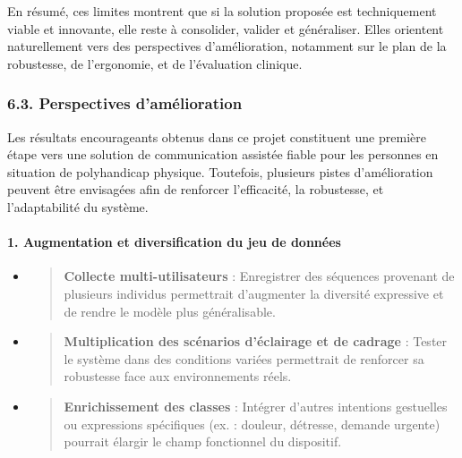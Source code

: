 \documentclass[
]{article}
\begin{document}
En résumé, ces limites montrent que si la solution proposée est techniquement viable et innovante, elle reste à consolider, valider et généraliser. Elles orientent naturellement vers des perspectives d'amélioration, notamment sur le plan de la robustesse, de l'ergonomie, et de l'évaluation clinique.

\hypertarget{perspectives-damuxe9lioration}{%
\subsubsection{6.3. Perspectives d'amélioration}\label{perspectives-damuxe9lioration}}

Les résultats encourageants obtenus dans ce projet constituent une première étape vers une solution de communication assistée fiable pour les personnes en situation de polyhandicap physique. Toutefois, plusieurs pistes d'amélioration peuvent être envisagées afin de renforcer l'efficacité, la robustesse, et l'adaptabilité du système.

\hypertarget{augmentation-et-diversification-du-jeu-de-donnuxe9es}{%
\paragraph{\texorpdfstring{\textbf{1. Augmentation et diversification du jeu de données}}{1. Augmentation et diversification du jeu de données}}\label{augmentation-et-diversification-du-jeu-de-donnuxe9es}}

\begin{itemize}
\item
  \begin{quote}
  \textbf{Collecte multi-utilisateurs} : Enregistrer des séquences provenant de plusieurs individus permettrait d'augmenter la diversité expressive et de rendre le modèle plus généralisable.
  \end{quote}
\item
  \begin{quote}
  \textbf{Multiplication des scénarios d'éclairage et de cadrage} : Tester le système dans des conditions variées permettrait de renforcer sa robustesse face aux environnements réels.
  \end{quote}
\item
  \begin{quote}
  \textbf{Enrichissement des classes} : Intégrer d'autres intentions gestuelles ou expressions spécifiques (ex. : douleur, détresse, demande urgente) pourrait élargir le champ fonctionnel du dispositif.
  \end{quote}
\end{itemize}
\end{document}
